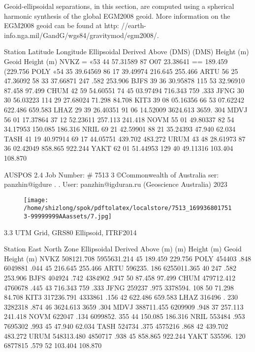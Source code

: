 \documentclass[a4paper,12pt]{article}
\begin{document}
    Geoid-ellipsoidal separations, in this section, are computed using a spherical harmonic  synthesis of the global EGM2008 geoid. More information on the EGM2008 geoid can be  found at http: //earth-info.nga.mil/GandG/wgs84/gravitymod/egm2008/. 

\vspace{10pt}

         Station Latitude Longitude Ellipsoidal Derived Above                   (DMS) (DMS) Height (m) Geoid Height (m)  NVKZ = «53 44 57.31589 87 O07 23.38641 == 189.459 (229.756  POLY «54 35 39.64569 86 17 39.49974 216.645 255.466  ARTU 56 25 47.36092 58 33 37.66871 247 .582 253.906  BJFS 39 36 30.95878 115 53 32.96910 87.458 97.499  CHUM 42 59 54.60551 74 45 03.97494 716.343 759 .333  JFNG 30 30 56.03223 114 29 27.68024 71.298 84.708  KIT3 39 08 05.16356 66 53 07.62242 622.486 659.583  LHAZ 29 39 26.40351 91 06 14.52009 3624.613 3659. 304  MDVJ 56 01 17.37864 37 12 52.23611 257.113 241.418  NOVM 55 01 49.80337 82 54 34.17953 150.085 186.316  NRIL 69 21 42.59901 88 21 35.24393 47.940 62.034  TASH 41 19 40.97914 69 17 44.05751 439.702 483.272  URUM 43 48 28.61973 87 36 02.42049 858.865 922.244    YAKT 62 01 51.44953 129 40 49.11316 103.404 108.870     

\vspace{10pt}

         AUSPOS 2.4 Job Number: \# 7513 3 ©Commonwealth of Australia    ser: panzhin@igdure . .  User: panzhin@igduran.ru (Geoscience Australia) 2023 

\vspace{10pt}

\par

\vspace{10pt}

\begin{figure}[h]

\texttt{[image: /home/shizlong/spok/pdftolatex/localstore/7513\_1699368017513-99999999AAassets/7.jpg]}

\centering

\end{figure}

    3.3 UTM Grid, GRS80 Ellipsoid, ITRF2014 

\vspace{10pt}

         Station East North Zone Ellipsoidal Derived Above                   (m) (m) Height (m) Geoid Height (m)  NVKZ 508121.708 5955631.214 45 189.459 229.756  POLY 454403 .848 6049881 .044 45 216.645 255.466  ARTU 596235. 186 6255011.365 40 247 .582 253.906  BJFS 404924 .742 4384902 .947 50 87.458 97.499  CHUM 479712.412 4760678 .445 43 716.343 759 .333  JFNG 259237 .975 3378594. 108 50 71.298 84.708  KIT3 317236.791 4333861 .156 42 622.486 659.583  LHAZ 316496 . 230 3282318 .874 46 3624.613 3659 .304  MDVJ 388711.455 6209909 .948 37 257.113 241.418  NOVM 622047 .134 6099852. 355 44 150.085 186.316  NRIL 553484 .953 7695302 .993 45 47.940 62.034  TASH 524734 .375 4575216 .868 42 439.702 483.272  URUM 548313.480 4850717 .938 45 858.865 922.244    YAKT 535596. 120 6877815 .579 52 103.404 108.870     
\end{document}
